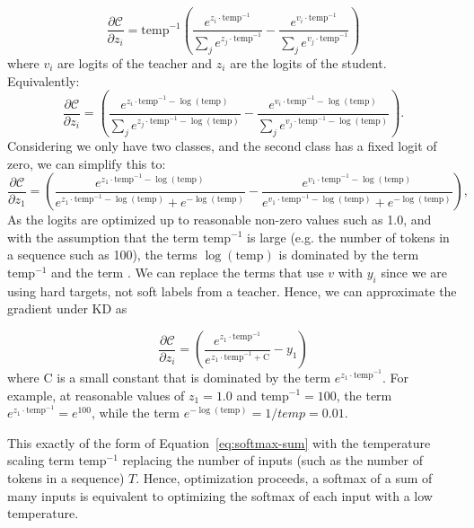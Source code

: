 \documentclass[twoside,11pt]{article}
\begin{document}
\[
\frac{\partial \mathcal{C}}{\partial z_i} = \mathrm{temp}^{-1} \left( 
\frac{e^{z_i \cdot \mathrm{temp}^{-1}}}{\sum_j e^{z_j \cdot \mathrm{temp}^{-1}}} 
- 
\frac{e^{v_i \cdot \mathrm{temp}^{-1}}}{\sum_j e^{v_j \cdot \mathrm{temp}^{-1}}} 
\right)
\] 
where $v_i$ are logits of the teacher and
$z_i$ are the logits of the student. Equivalently:
\[
\frac{\partial \mathcal{C}}{\partial z_i} = \left( 
\frac{e^{z_i \cdot \mathrm{temp}^{-1} - \log(\mathrm{temp})}}{\sum_j e^{z_j \cdot \mathrm{temp}^{-1} - \log(\mathrm{temp})}} 
- 
\frac{e^{v_i \cdot \mathrm{temp}^{-1} - \log(\mathrm{temp})}}{\sum_j e^{v_j \cdot \mathrm{temp}^{-1} - \log(\mathrm{temp})}} 
\right).
\]
Considering we only have two classes, and the second class has a fixed
logit of zero, we can simplify this to:
\[
\frac{\partial \mathcal{C}}{\partial z_1} 
= 
\left( 
\frac{e^{z_1 \cdot \mathrm{temp}^{-1} - \log(\mathrm{temp})}}{e^{z_1 \cdot \mathrm{temp}^{-1} - \log(\mathrm{temp})} + e^{-\log(\mathrm{temp})}} 
- 
\frac{e^{v_1 \cdot \mathrm{temp}^{-1} - \log(\mathrm{temp})}}{e^{v_1 \cdot \mathrm{temp}^{-1} - \log(\mathrm{temp})} + e^{-\log(\mathrm{temp})}} 
\right),
\]
As the logits are optimized up to reasonable non-zero values such as 1.0, 
and with
the assumption that the term $\mathrm{temp}^{-1}$ is large (e.g. the 
number of tokens in a sequence such as 100), 
the terms $\log(\mathrm{temp})$ is dominated
by the term $\mathrm{temp}^{-1}$ and the term . We can replace the terms that use $v$
with $y_i$ since we are using hard targets, not soft labels from a teacher. 
Hence, we can approximate the gradient under KD as

\begin{equation}
\frac{\partial \mathcal{C}}{\partial z_i} = \left( 
  \frac{e^{z_1 \cdot \mathrm{temp}^{-1} }}{e^{z_1 \cdot \mathrm{temp}^{-1} + \mathrm{C}}} 
  - 
y_1
\right)
\end{equation}
where $\mathrm{C}$ is a small constant that is dominated by the term 
$e^{z_1 \cdot \mathrm{temp}^{-1}}$. 
For example, at reasonable values of 
$z_1 = 1.0$ and $\mathrm{temp}^{-1} = 100$, the term 
$e^{z_1 \cdot \mathrm{temp}^{-1}} = e^{100}$, while the term
$e^{-\log(\mathrm{temp})} = 1 / temp = 0.01$. 

This exactly of the form of Equation~\ref{eq:softmax-sum} with the 
temperature scaling term $\mathrm{temp}^{-1}$ replacing the number of inputs 
(such as the number of tokens in a sequence) $T$.
Hence, optimization proceeds, a softmax of a sum of
many inputs is equivalent to optimizing the softmax of each input with
a low temperature. 
\end{document}
